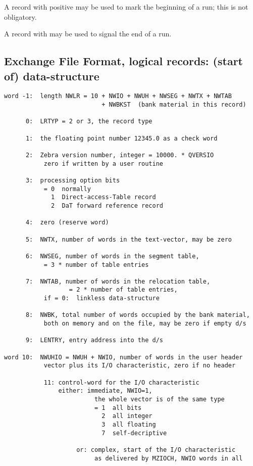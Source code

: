 A record  with  positive may be used to mark the beginning
of a run; this is not obligatory.

A record  with  may be used to signal the end of a run.

\subsection*{Exchange File Format, logical records: (start of) data-structure}

\begin{verbatim}
word -1:  length NWLR = 10 + NWIO + NWUH + NWSEG + NWTX + NWTAB
                           + NWBKST  (bank material in this record)

      0:  LRTYP = 2 or 3, the record type

      1:  the floating point number 12345.0 as a check word

      2:  Zebra version number, integer = 10000. * QVERSIO
           zero if written by a user routine

      3:  processing option bits
           = 0  normally
             1  Direct-access-Table record
             2  DaT forward reference record

      4:  zero (reserve word)

      5:  NWTX, number of words in the text-vector, may be zero

      6:  NWSEG, number of words in the segment table,
           = 3 * number of table entries

      7:  NWTAB, number of words in the relocation table,
                  = 2 * number of table entries,
           if = 0:  linkless data-structure

      8:  NWBK, total number of words occupied by the bank material,
           both on memory and on the file, may be zero if empty d/s

      9:  LENTRY, entry address into the d/s

word 10:  NWUHIO = NWUH + NWIO, number of words in the user header
           vector plus its I/O characteristic, zero if no header

           11: control-word for the I/O characteristic
               either: immediate, NWIO=1,
                         the whole vector is of the same type
                         = 1  all bits
                           2  all integer
                           3  all floating
                           7  self-decriptive

                    or: complex, start of the I/O characteristic
                         as delivered by MZIOCH, NWIO words in all

\end{verbatim}

